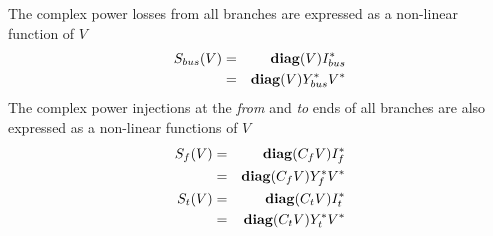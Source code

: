 The complex power losses from all branches are expressed as a non-linear
function of $V$
\begin{eqnarray}
S_{bus}(V)& =& \mathop{\mathbf{diag}}(V)I_{bus}^* \nonumber \\
\label{eq:sbus}
&= & \mathop{\mathbf{diag}}(V)Y_{bus}^*V^*
\end{eqnarray}
The complex power injections at the \textit{from} and \textit{to} ends of all
branches are also expressed as a non-linear functions of $V$
\begin{eqnarray}
S_{f}(V)& =& \mathop{\mathbf{diag}}(C_fV)I_f^* \nonumber \\
\label{eq:sf_loss}
& =& \mathop{\mathbf{diag}}(C_fV)Y_f^*V^*\\
S_{t}(V)& =& \mathop{\mathbf{diag}}(C_tV)I_t^* \nonumber \\
\label{eq:st_loss}
& =& \mathop{\mathbf{diag}}(C_tV)Y_t^*V^*
\end{eqnarray}

